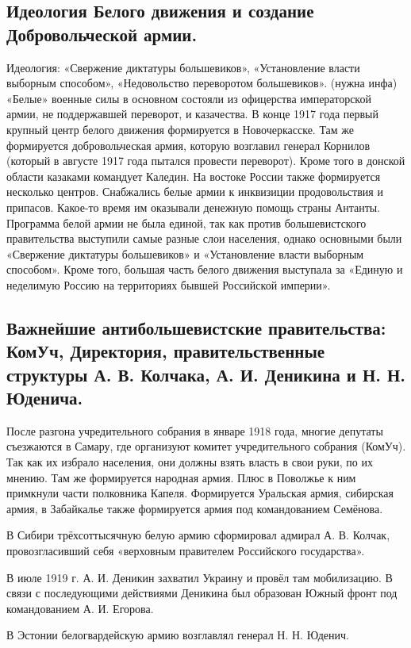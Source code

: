\subsection{Идеология Белого движения и создание Добровольческой армии.}

Идеология: «Свержение диктатуры большевиков», «Установление власти выборным способом», «Недовольство переворотом большевиков». (нужна инфа)
«Белые» военные силы в основном состояли из офицерства императорской армии, не поддержавшей переворот, и казачества. В конце 1917 года первый крупный центр белого движения формируется в Новочеркасске. Там же формируется добровольческая армия, которую возглавил генерал Корнилов (который в августе 1917 года пытался провести переворот). Кроме того в донской области казаками командует Каледин. На востоке России также формируется несколько центров.
Снабжались белые армии к инквизиции продовольствия и припасов. Какое-то время им оказывали денежную помощь страны Антанты.
Программа белой армии не была единой, так как против большевистского правительства выступили самые разные слои населения, однако основными были «Свержение диктатуры большевиков» и «Установление власти выборным способом». Кроме того, большая часть белого движения выступала за «Единую и неделимую Россию на территориях бывшей Российской	 империи».

\subsection{Важнейшие антибольшевистские правительства: КомУч, Директория, правительственные структуры А. В. Колчака, А. И. Деникина и Н. Н. Юденича.}
После разгона учредительного собрания в январе 1918 года, многие депутаты съезжаются в Самару, где организуют комитет учредительного собрания (КомУч). Так как их избрало населения, они должны взять власть в свои руки, по их мнению. Там же формируется народная армия. Плюс в Поволжье к ним примкнули части полковника Капеля. Формируется Уральская армия, сибирская армия, в Забайкалье также формируется армия под командованием Семёнова. 

В Сибири трёхсоттысячную белую армию сформировал адмирал А. В. Колчак, провозгласивший себя «верховным правителем Российского государства».

В июле 1919 г. А. И. Деникин захватил Украину и провёл там мобилизацию. В связи с последующими действиями Деникина был образован Южный фронт под командованием А. И. Егорова.

В Эстонии белогвардейскую армию возглавлял генерал Н. Н. Юденич.

